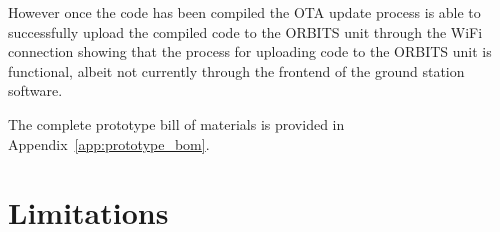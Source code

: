 \documentclass[a4paper,12pt,titlepage]{report}
\begin{document}
However once the code has been compiled the OTA update process is able to successfully upload the compiled code to the ORBITS unit through the WiFi connection showing that the process for uploading code to the ORBITS unit is functional, albeit not currently through the frontend of the ground station software.

The complete prototype bill of materials is provided in Appendix~\ref{app:prototype_bom}. 


\section{Limitations}
\end{document}
